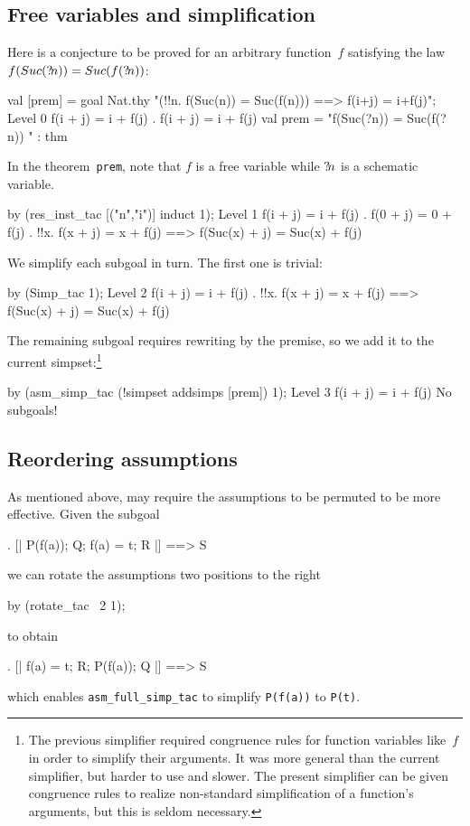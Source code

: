 \subsection{Free variables and simplification}
Here is a conjecture to be proved for an arbitrary function~$f$ satisfying
the law $f(Suc({?\!n})) = Suc(f({?\!n}))$:
\begin{ttbox}
val [prem] = goal Nat.thy
    "(!!n. f(Suc(n)) = Suc(f(n))) ==> f(i+j) = i+f(j)";
{\out Level 0}
{\out f(i + j) = i + f(j)}
{. f(i + j) = i + f(j)}
\ttbreak
{\out val prem = "f(Suc(?n)) = Suc(f(?n))}
{\out             [!!n. f(Suc(n)) = Suc(f(n))]" : thm}
\end{ttbox}
In the theorem~{\tt prem}, note that $f$ is a free variable while
${?\!n}$ is a schematic variable.
\begin{ttbox}
by (res_inst_tac [("n","i")] induct 1);
{\out Level 1}
{\out f(i + j) = i + f(j)}
{. f(0 + j) = 0 + f(j)}
{. !!x. f(x + j) = x + f(j) ==> f(Suc(x) + j) = Suc(x) + f(j)}
\end{ttbox}
We simplify each subgoal in turn.  The first one is trivial:
\begin{ttbox}
by (Simp_tac 1);
{\out Level 2}
{\out f(i + j) = i + f(j)}
{. !!x. f(x + j) = x + f(j) ==> f(Suc(x) + j) = Suc(x) + f(j)}
\end{ttbox}
The remaining subgoal requires rewriting by the premise, so we add it
to the current simpset:\footnote{The previous simplifier required
  congruence rules for function variables like~$f$ in order to
  simplify their arguments.  It was more general than the current
  simplifier, but harder to use and slower.  The present simplifier
  can be given congruence rules to realize non-standard simplification
  of a function's arguments, but this is seldom necessary.}
\begin{ttbox}
by (asm_simp_tac (!simpset addsimps [prem]) 1);
{\out Level 3}
{\out f(i + j) = i + f(j)}
{\out No subgoals!}
\end{ttbox}

\subsection{Reordering assumptions}
\label{sec:reordering-asms}

As mentioned above,  may require the assumptions
to be permuted to be more effective. Given the subgoal
\begin{ttbox}
{. [| P(f(a)); Q; f(a) = t; R |] ==> S}
\end{ttbox}
we can rotate the assumptions two positions to the right
\begin{ttbox}
by (rotate_tac ~2 1);
\end{ttbox}
to obtain
\begin{ttbox}
{. [| f(a) = t; R; P(f(a)); Q |] ==> S}
\end{ttbox}
which enables \verb$asm_full_simp_tac$ to simplify \verb$P(f(a))$ to
\verb$P(t)$.

